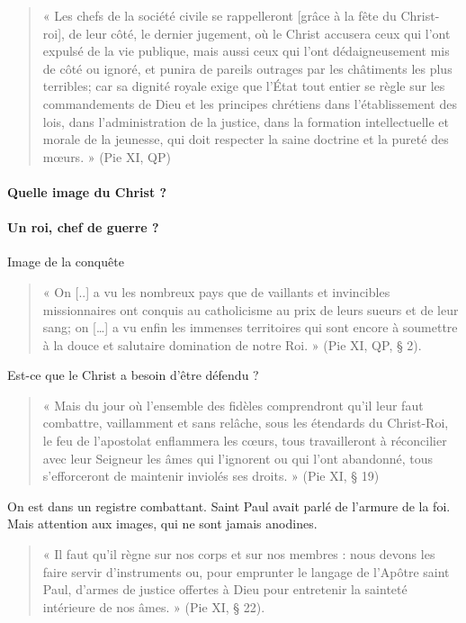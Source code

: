 \begin{quote}
    « Les chefs de la société civile se rappelleront [grâce à la fête du Christ-roi], de leur côté, le dernier jugement, où le Christ accusera ceux qui l'ont expulsé de la vie publique, mais aussi ceux qui l'ont dédaigneusement mis de côté ou ignoré, et punira de pareils outrages par les châtiments les plus terribles; car sa dignité royale exige que l'État tout entier se règle sur les commandements de Dieu et les principes chrétiens dans l'établissement des lois, dans l'administration de la justice, dans la formation intellectuelle et morale de la jeunesse, qui doit respecter la saine doctrine et la pureté des mœurs. » (Pie XI, QP) 
\end{quote}

\paragraph{Quelle image du Christ ?}

\paragraph{Un roi, chef de guerre ?}
Image de la conquête

\begin{quote}
    « On [..] a vu les nombreux pays que de vaillants et invincibles missionnaires ont conquis au catholicisme au prix de leurs sueurs et de leur sang; on […] a vu enfin les immenses territoires qui sont encore à soumettre à la douce et salutaire domination de notre Roi. » (Pie XI, QP, § 2). 
\end{quote}

Est-ce que le Christ a besoin d'être défendu ?

\begin{quote}
    « Mais du jour où l'ensemble des fidèles comprendront qu'il leur faut combattre, vaillamment et sans relâche, sous les étendards du Christ-Roi, le feu de l'apostolat enflammera les cœurs, tous travailleront à réconcilier avec leur Seigneur les âmes qui l'ignorent ou qui l'ont abandonné, tous s'efforceront de maintenir inviolés ses droits. » (Pie XI, § 19)  
\end{quote}

On est dans un registre combattant. Saint Paul avait parlé de l'armure de la foi. Mais attention aux images, qui ne sont jamais anodines. 

\begin{quote}
    « Il faut qu'il règne sur nos corps et sur nos membres : nous devons les faire servir d'instruments ou, pour emprunter le langage de l'Apôtre saint Paul, d'armes de justice offertes à Dieu pour entretenir la sainteté intérieure de nos âmes. » (Pie XI, § 22). 
\end{quote}

